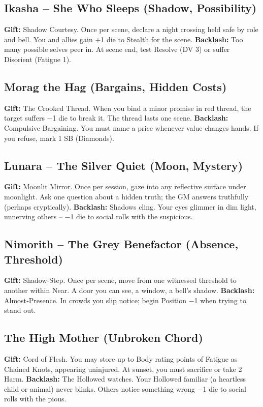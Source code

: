 \documentclass[10pt,a5paper]{book}
\begin{document}
\subsection{Ikasha -- She Who Sleeps (Shadow, Possibility)}
\textbf{Gift:} Shadow Courtesy. Once per scene, declare a night crossing held safe by role and bell. You and allies gain +1 die to Stealth for the scene.
\textbf{Backlash:} Too many possible selves peer in. At scene end, test Resolve (DV 3) or suffer Disorient (Fatigue 1).

\subsection{Morag the Hag (Bargains, Hidden Costs)}
\textbf{Gift:} The Crooked Thread. When you bind a minor promise in red thread, the target suffers −1 die to break it. The thread lasts one scene.
\textbf{Backlash:} Compulsive Bargaining. You must name a price whenever value changes hands. If you refuse, mark 1 SB (Diamonds).

\subsection{Lunara -- The Silver Quiet (Moon, Mystery)}
\textbf{Gift:} Moonlit Mirror. Once per session, gaze into any reflective surface under moonlight. Ask one question about a hidden truth; the GM answers truthfully (perhaps cryptically).
\textbf{Backlash:} Shadows cling. Your eyes glimmer in dim light, unnerving others -- −1 die to social rolls with the suspicious.

\subsection{Nimorith -- The Grey Benefactor (Absence, Threshold)}
\textbf{Gift:} Shadow‑Step. Once per scene, move from one witnessed threshold to another within Near. A door you can see, a window, a bell's shadow.
\textbf{Backlash:} Almost‑Presence. In crowds you slip notice; begin Position −1 when trying to stand out.

\subsection{The High Mother (Unbroken Chord)}
\textbf{Gift:} Cord of Flesh. You may store up to Body rating points of Fatigue as Chained Knots, appearing uninjured. At sunset, you must sacrifice or take 2 Harm.
\textbf{Backlash:} The Hollowed watches. Your Hollowed familiar (a heartless child or animal) never blinks. Others notice something wrong −1 die to social rolls with the pious.
\end{document}
